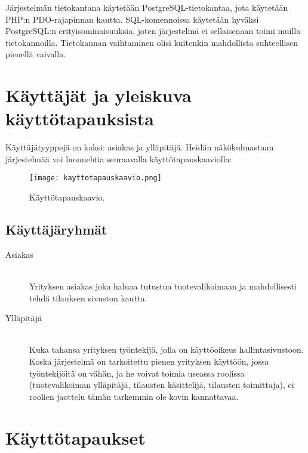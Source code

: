 \documentclass[a4paper, 12pt, finnish]{article}
\begin{document}
Järjestelmän tietokantana käytetään PostgreSQL-tietokantaa, jota käytetään PHP:n PDO-rajapinnan kautta. SQL-komennoissa käytetään hyväksi PostgreSQL:n erityisominaisuuksia, joten järjestelmä ei sellaisenaan toimi muilla tietokannoilla. Tietokannan vaihtaminen olisi kuitenkin mahdollista suhteellisen pienellä vaivalla.

\section{Käyttäjät ja yleiskuva käyttötapauksista}

Käyttäjätyyppejä on kaksi: asiakas ja ylläpitäjä. Heidän näkökulmastaan järjestelmää voi luonnehtia seuraavalla käyttötapauskaaviolla:

\begin{figure}[H]
	\begin{center}
	\caption{Käyttötapauskaavio.}
	\texttt{[image: kayttotapauskaavio.png]}
	\end{center}
\end{figure}

\subsection*{Käyttäjäryhmät}

\begin{description}
\item[Asiakas]\mbox{}\\Yrityksen asiakas joka haluaa tutustua tuotevalikoimaan ja mahdollisesti tehdä tilauksen sivuston kautta.
\item[Ylläpitäjä]\mbox{}\\Kuka tahansa yrityksen työntekijä, jolla on käyttöoikeus hallintasivustoon. Koska järjestelmä on tarkoitettu pienen yrityksen käyttöön, jossa työntekijöitä on vähän, ja he voivat toimia useassa roolissa (tuotevalikoiman ylläpitäjä, tilausten käsittelijä, tilausten toimittaja), ei roolien jaottelu tämän tarkemmin ole kovin kannattavaa.
\end{description}

\section{Käyttötapaukset}
\end{document}
